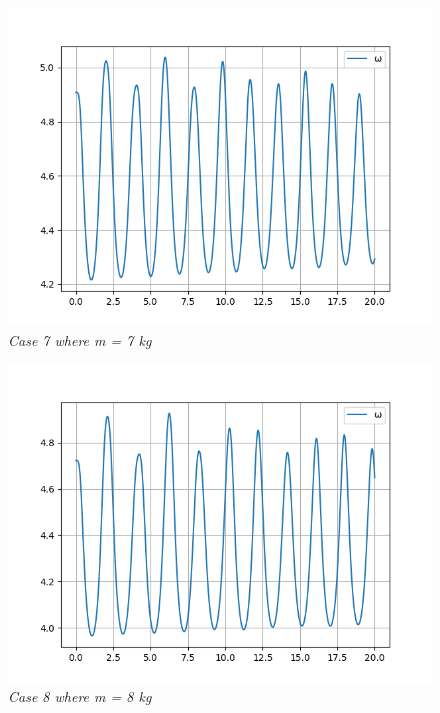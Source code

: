         \begin{figure}[H]
            \centering
            \includegraphics{Appendix/RSimPictures/AF/afm7.png}
            \caption{\textit{Case 7 where m = 7 kg}}
            \label{}
        \end{figure}
            
        \begin{figure}[H]
            \centering
            \includegraphics{Appendix/RSimPictures/AF/afm8.png}
            \caption{\textit{Case 8 where m = 8 kg}}
            \label{}
        \end{figure}
            

